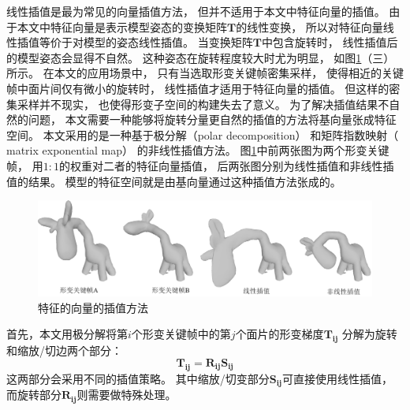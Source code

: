 线性插值是最为常见的向量插值方法，
但并不适用于本文中特征向量的插值。
由于本文中特征向量是表示模型姿态的变换矩阵$\bm{T}$的线性变换，
所以对特征向量线性插值等价于对模型的姿态线性插值。
当变换矩阵$\bm{T}$中包含旋转时，
线性插值后的模型姿态会显得不自然。
这种姿态在旋转程度较大时尤为明显，
如图\ref{linear_vs_unlinear}（三）所示。
在本文的应用场景中，
只有当选取形变关键帧密集采样，
使得相近的关键帧中面片间仅有微小的旋转时，
线性插值才适用于特征向量的插值。
但这样的密集采样并不现实，
也使得形变子空间的构建失去了意义。
为了解决插值结果不自然的问题，
本文需要一种能够将旋转分量更自然的插值的方法将基向量张成特征空间。
本文采用的是一种基于极分解（polar decomposition）\cite{shoemake1992matrix}
和矩阵指数映射（ matrix exponential map）\cite{murray2017mathematical}
\cite{trove.nla.gov.au/work/222715717}
的非线性插值方法。
图\ref{linear_vs_unlinear}中前两张图为两个形变关键帧，
用$1:1$的权重对二者的特征向量插值，
后两张图分别为线性插值和非线性插值的结果。
模型的特征空间就是由基向量通过这种插值方法张成的。
\begin{figure}
    \centering
    \includegraphics[width = \textwidth]{./Pictures/linear_vs_unlinear.png}
    \caption{特征的向量的插值方法}
    \label{linear_vs_unlinear}
\end{figure}

首先，本文用极分解将第$i$个形变关键帧中的第$j$个面片的形变梯度$\bm{T_{ij}}$
分解为旋转和缩放/切边两个部分：
\begin{equation}
    \bm{T_{ij}}=\bm{R_{ij}S_{ij}}
\end{equation}
这两部分会采用不同的插值策略。
其中缩放/切变部分$\bm{S_{ij}}$可直接使用线性插值，
而旋转部分$\bm{R_{ij}}$则需要做特殊处理。

